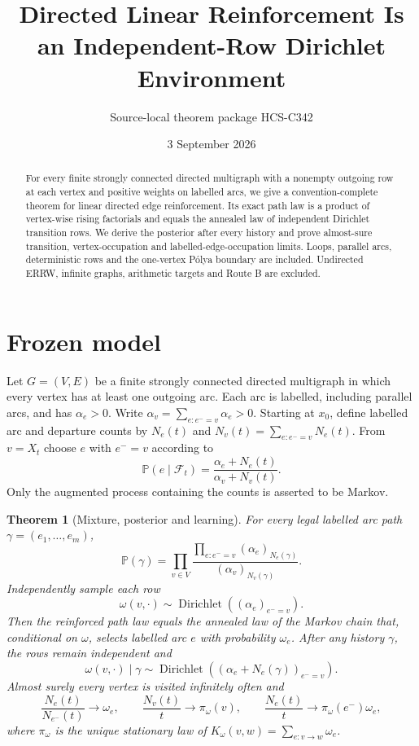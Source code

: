 \documentclass[10pt]{article}
\title{Directed Linear Reinforcement Is an Independent-Row Dirichlet Environment}
\author{Source-local theorem package HCS-C342}
\date{3 September 2026}
\newtheorem{theorem}{Theorem}
\newcommand{\Pp}{\mathbb P}
\begin{document}
\maketitle
\begin{abstract}
For every finite strongly connected directed multigraph with a nonempty
outgoing row at each vertex and positive weights on labelled arcs, we give a
convention-complete theorem for linear directed
edge reinforcement.  Its exact path law is a product of vertex-wise rising
factorials and equals the annealed law of independent Dirichlet transition
rows.  We derive the posterior after every history and prove almost-sure
transition, vertex-occupation and labelled-edge-occupation limits.  Loops,
parallel arcs, deterministic rows and the one-vertex Pólya boundary are
included.  Undirected ERRW, infinite graphs, arithmetic targets and Route B are
excluded.
\end{abstract}

\section{Frozen model}
Let $G=(V,E)$ be a finite strongly connected directed multigraph in which every
vertex has at least one outgoing arc. Each arc is labelled, including parallel
arcs, and has $\alpha_e>0$. Write
$\alpha_v=\sum_{e:e^-=v}\alpha_e>0$. Starting at $x_0$, define labelled arc and
departure counts by $N_e(t)$ and
$N_v(t)=\sum_{e:e^-=v}N_e(t)$.  From $v=X_t$ choose $e$ with $e^-=v$ according
to
\[
 \Pp(e\mid\mathcal F_t)=
 \frac{\alpha_e+N_e(t)}{\alpha_v+N_v(t)}.                 \tag{1}
\]
Only the augmented process containing the counts is asserted to be Markov.

\begin{theorem}[Mixture, posterior and learning]\label{thm:main}
For every legal labelled arc path $\gamma=(e_1,\ldots,e_m)$,
\[
 \Pp(\gamma)=\prod_{v\in V}
 \frac{\prod_{e:e^-=v}(\alpha_e)_{N_e(\gamma)}}
      {(\alpha_v)_{N_v(\gamma)}}.                        \tag{2}
\]
Independently sample each row
\[
 \omega(v,\cdot)\sim\operatorname{Dirichlet}
 ((\alpha_e)_{e^-=v}).                                   \tag{3}
\]
Then the reinforced path law equals the annealed law of the Markov chain that,
conditional on $\omega$, selects labelled arc $e$ with probability $\omega_e$.
After any history $\gamma$, the rows remain independent and
\[
 \omega(v,\cdot)\mid\gamma\sim\operatorname{Dirichlet}
 ((\alpha_e+N_e(\gamma))_{e^-=v}).                       \tag{4}
\]
Almost surely every vertex is visited infinitely often and
\[
 \frac{N_e(t)}{N_{e^-}(t)}\to\omega_e,\qquad
 \frac{N_v(t)}t\to\pi_\omega(v),\qquad
 \frac{N_e(t)}t\to\pi_\omega(e^-)\omega_e,               \tag{5}
\]
where $\pi_\omega$ is the unique stationary law of
$K_\omega(v,w)=\sum_{e:v\to w}\omega_e$.
\end{theorem}
\end{document}
